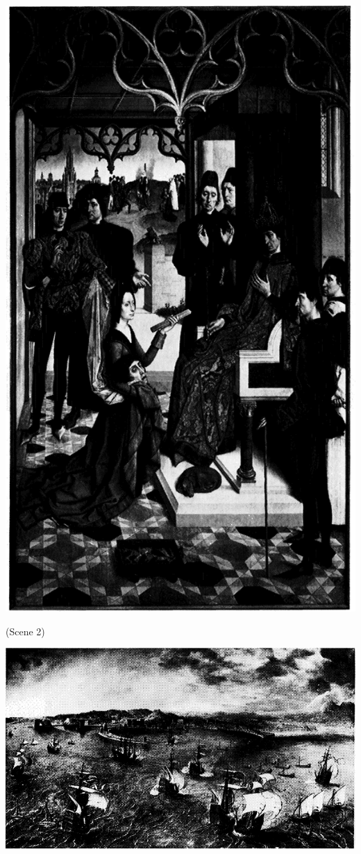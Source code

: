 \protect\hypertarget{20_ILLUSTRATIONS_FOLLOW_PAGE.xhtmlux5cux23id_12}{}{}\includegraphics{include/html/images/332_1.png}

(Scene 2)

\protect\hypertarget{20_ILLUSTRATIONS_FOLLOW_PAGE.xhtmlux5cux23id_13}{}{}\includegraphics{include/html/images/333_1.png}

